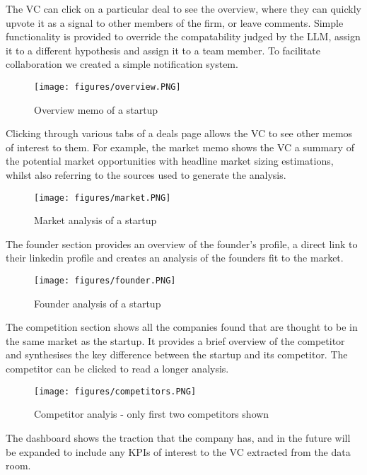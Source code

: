 \documentclass[a4paper, oneside]{discothesis}
\begin{document}
The VC can click on a particular deal to see the overview, where they can quickly upvote it as a signal to other members of the firm, or leave comments. Simple functionality is provided to override the compatability judged by the LLM, assign it to a different hypothesis and assign it to a team member. To facilitate collaboration we created a simple notification system. 

\begin{figure}[h]
    \centering
    \texttt{[image: figures/overview.PNG]}
    \caption{Overview memo of a startup}
    \label{fig:overview_memo}
\end{figure}
\pagebreak

Clicking through various tabs of a deals page allows the VC to see other memos of interest to them. For example, the market memo shows the VC a summary of the potential market opportunities with headline market sizing estimations, whilst also referring to the sources used to generate the analysis.


\begin{figure}[h]
    \centering
    \texttt{[image: figures/market.PNG]}
    \caption{Market analysis of a startup}
    \label{fig:market_memo}
\end{figure}

The founder section provides an overview of the founder's profile, a direct link to their linkedin profile and creates an analysis of the founders fit to the market.

\begin{figure}[h]
    \centering
    \texttt{[image: figures/founder.PNG]}
    \caption{Founder analysis of a startup}
    \label{fig:founder_memo}
\end{figure}

The competition section shows all the companies found that are thought to be in the same market as the startup. It provides a brief overview of the competitor and synthesises the key difference between the startup and its competitor. The competitor can be clicked to read a longer analysis.

\begin{figure}[h]
    \centering
    \texttt{[image: figures/competitors.PNG]}
    \caption{Competitor analyis - only first two competitors shown}
    \label{fig:competition}
\end{figure}

\pagebreak


The dashboard shows the traction that the company has, and in the future will be expanded to include any KPIs of interest to the VC extracted from the data room. 
\end{document}
